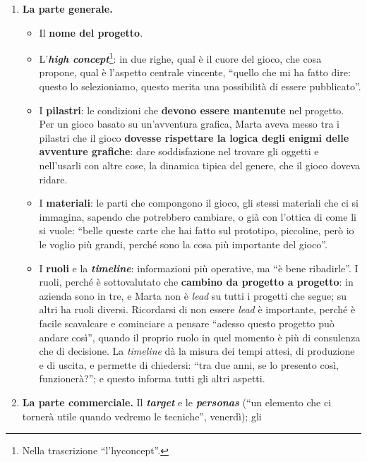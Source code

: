 \begin{enumerate}
  \item \textbf{La parte generale.}
    \begin{itemize}
      \item Il \textbf{nome del progetto}.
      \item L'\textbf{\emph{high concept}}\footnote{Nella trascrizione ``l'hyconcept''.}:
            in due righe, qual è il cuore del gioco, che cosa propone, qual è l'aspetto
            centrale vincente, ``quello che mi ha fatto dire: questo lo selezioniamo, questo
            merita una possibilità di essere pubblicato''.
      \item I \textbf{pilastri}: le condizioni che \textbf{devono essere mantenute} nel
            progetto. Per un gioco basato su un'avventura grafica, Marta aveva messo tra i
            pilastri che il gioco \textbf{dovesse rispettare la logica degli enigmi delle
            avventure grafiche}: dare soddisfazione nel trovare gli oggetti e nell'usarli
            con altre cose, la dinamica tipica del genere, che il gioco doveva ridare.
      \item I \textbf{materiali}: le parti che compongono il gioco, gli stessi materiali che
            ci si immagina, sapendo che potrebbero cambiare, o già con l'ottica di come li
            si vuole: ``belle queste carte che hai fatto sul prototipo, piccoline, però io
            le voglio più grandi, perché sono la cosa più importante del gioco''.
      \item I \textbf{ruoli} e la \textbf{\emph{timeline}}: informazioni più operative, ma
            ``è bene ribadirle''. I ruoli, perché è sottovalutato che \textbf{cambino da
            progetto a progetto}: in azienda sono in tre, e Marta non è \emph{lead} su tutti
            i progetti che segue; su altri ha ruoli diversi. Ricordarsi di non essere
            \emph{lead} è importante, perché è facile scavalcare e cominciare a pensare
            ``adesso questo progetto può andare così'', quando il proprio ruolo in quel
            momento è più di consulenza che di decisione. La \emph{timeline} dà la misura
            dei tempi attesi, di produzione e di uscita, e permette di chiedersi: ``tra due
            anni, se lo presento così, funzionerà?''; e questo informa tutti gli altri
            aspetti.
    \end{itemize}
  \item \textbf{La parte commerciale.} Il \textbf{\emph{target}} e le \textbf{\emph{personas}}
        (``un elemento che ci tornerà utile quando vedremo le tecniche'', venerdì); gli

\end{enumerate}
